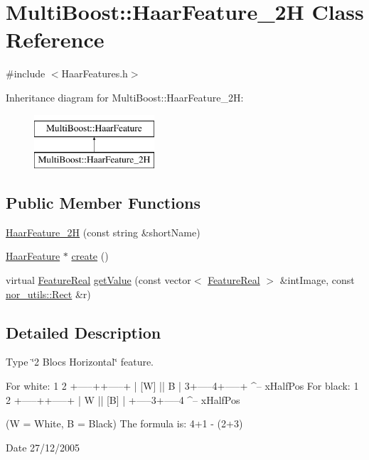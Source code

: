 \hypertarget{classMultiBoost_1_1HaarFeature__2H}{
\section{MultiBoost::HaarFeature\_\-2H Class Reference}
\label{classMultiBoost_1_1HaarFeature__2H}
}


{\ttfamily \#include $<$HaarFeatures.h$>$}

Inheritance diagram for MultiBoost::HaarFeature\_\-2H:\begin{figure}[H]
\begin{center}
\leavevmode
\includegraphics[height=2.000000cm]{classMultiBoost_1_1HaarFeature__2H}
\end{center}
\end{figure}
\subsection*{Public Member Functions}
\begin{DoxyCompactItemize}
\item 
\hyperlink{classMultiBoost_1_1HaarFeature__2H_a66f851ca237b7887e46b22a6ae77713b}{HaarFeature\_\-2H} (const string \&shortName)
\item 
\hyperlink{classMultiBoost_1_1HaarFeature}{HaarFeature} $\ast$ \hyperlink{classMultiBoost_1_1HaarFeature__2H_af55abf21457be8654bb2c4b94a147883}{create} ()
\item 
virtual \hyperlink{Defaults_8h_a3a11cfe6a5d469d921716ca6291e934f}{FeatureReal} \hyperlink{classMultiBoost_1_1HaarFeature__2H_aee53febb25c4ad0460b301e902d096c8}{getValue} (const vector$<$ \hyperlink{Defaults_8h_a3a11cfe6a5d469d921716ca6291e934f}{FeatureReal} $>$ \&intImage, const \hyperlink{structnor__utils_1_1Rect}{nor\_\-utils::Rect} \&r)
\end{DoxyCompactItemize}


\subsection{Detailed Description}
Type \char`\"{}2 Blocs Horizontal\char`\"{} feature. \begin{DoxyVerb}
	 For white:
	 1      2   
	 +-----++-----+
	 | [W] ||  B  |
	 3+-----4+-----+
	 ^-- xHalfPos
	 For black:
	 1      2
	 +-----++-----+
	 |  W  || [B] |
	 +-----3+-----4
	 ^-- xHalfPos
	 \end{DoxyVerb}
 (W = White, B = Black) The formula is: 4+1 -\/ (2+3) \begin{DoxyDate}{Date}
27/12/2005 
\end{DoxyDate}


